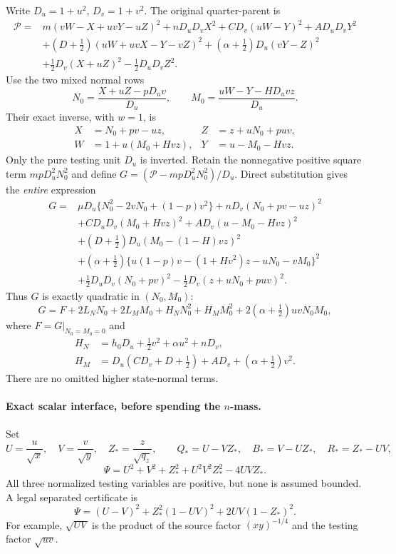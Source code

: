 Write $D_u=1+u^2$, $D_v=1+v^2$.  The original quarter-parent is
\begin{align}
 \mathcal P={}&m(vW-X+uvY-uZ)^2+nD_uD_vX^2
  +CD_v(uW-Y)^2+AD_uD_vY^2\\
 &+(D+\tfrac12)(uW+uvX-Y-vZ)^2
  +(\alpha+\tfrac12)D_u(vY-Z)^2\\
 &+\tfrac12D_v(X+uZ)^2-\tfrac12D_uD_vZ^2.               \tag{RFN4}
\end{align}
Use the two mixed normal rows
\[
 N_0=\frac{X+uZ-pD_uv}{D_u},\qquad
 M_0=\frac{uW-Y-HD_uvz}{D_u}.                            \tag{RFN5}
\]
Their exact inverse, with $w=1$, is
\[
 \begin{aligned}
 X&=N_0+pv-uz,&Z&=z+uN_0+puv,\\
 W&=1+u(M_0+Hvz),&Y&=u-M_0-Hvz.
 \end{aligned}                                           \tag{RFN6}
\]
Only the pure testing unit $D_u$ is inverted.  Retain the nonnegative
positive square term $mpD_u^2N_0^2$ and define
$G=(\mathcal P-mpD_u^2N_0^2)/D_u$.  Direct substitution gives the
\emph{entire} expression
\begin{align}
 G={}&\mu D_u\{N_0^2-2vN_0+(1-p)v^2\}
       +nD_v(N_0+pv-uz)^2\\
 &+CD_uD_v(M_0+Hvz)^2+A D_v(u-M_0-Hvz)^2\\
 &+(D+\tfrac12)D_u(M_0-(1-H)vz)^2\\
 &+(\alpha+\tfrac12)
   \{u(1-p)v-(1+Hv^2)z-uN_0-vM_0\}^2\\
 &+\tfrac12D_uD_v(N_0+pv)^2
       -\tfrac12D_v(z+uN_0+puv)^2.                      \tag{RFN7}
\end{align}
Thus $G$ is exactly quadratic in $(N_0,M_0)$:
\[
 G=F+2L_NN_0+2L_MM_0+H_NN_0^2+H_MM_0^2
                  +2(\alpha+\tfrac12)uvN_0M_0,          \tag{RFN8}
\]
where $F=G|_{N_0=M_0=0}$ and
\[
 \begin{split}
 H_N&=h_0D_u+\tfrac12v^2+\alpha u^2+nD_v,\\
 H_M&=D_u(CD_v+D+\tfrac12)+AD_v+(\alpha+\tfrac12)v^2.
 \end{split}                                           \tag{RFN9}
\]
There are no omitted higher state-normal terms.

\paragraph{Exact scalar interface, before spending the $n$-mass.}
Set
\[
 U=\frac u{\sqrt x},\quad V=\frac v{\sqrt y},\quad
 Z_* =\frac z{\sqrt{q_z}},\qquad
 Q_*=U-VZ_*,\quad B_*=V-UZ_*,\quad R_*=Z_*-UV,
\]
\[
 \Psi=U^2+V^2+Z_*^2+U^2V^2Z_*^2-4UVZ_*.                 \tag{RFN10}
\]
All three normalized testing variables are positive, but none is
assumed bounded.  A legal separated certificate is
\[
 \Psi=(U-V)^2+Z_*^2(1-UV)^2+2UV(1-Z_*)^2.               \tag{RFN11}
\]
For example, $\sqrt{UV}$ is the product of the source factor
$(xy)^{-1/4}$ and the testing factor $\sqrt{uv}$.

